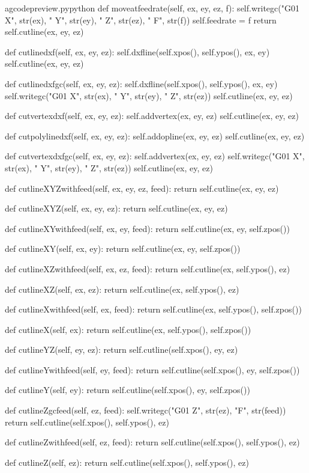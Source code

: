 \documentclass{ltxdoc}
\begin{document}
\lstset{firstnumber=\thegcpy}
\begin{writecode}{a}{gcodepreview.py}{python}
    def moveatfeedrate(self, ex, ey, ez, f):
        self.writegc("G01 X", str(ex), " Y", str(ey), " Z", str(ez), " F", str(f))
        self.feedrate = f
        return self.cutline(ex, ey, ez)

    def cutlinedxf(self, ex, ey, ez):
        self.dxfline(self.xpos(), self.ypos(), ex, ey)
        self.cutline(ex, ey, ez)

    def cutlinedxfgc(self, ex, ey, ez):
        self.dxfline(self.xpos(), self.ypos(), ex, ey)
        self.writegc("G01 X", str(ex), " Y", str(ey), " Z", str(ez))
        self.cutline(ex, ey, ez)

    def cutvertexdxf(self, ex, ey, ez):
        self.addvertex(ex, ey, ez)
        self.cutline(ex, ey, ez)

    def cutpolylinedxf(self, ex, ey, ez):
        self.addopline(ex, ey, ez)
        self.cutline(ex, ey, ez)

    def cutvertexdxfgc(self, ex, ey, ez):
        self.addvertex(ex, ey, ez)
        self.writegc("G01 X", str(ex), " Y", str(ey), " Z", str(ez))
        self.cutline(ex, ey, ez)

    def cutlineXYZwithfeed(self, ex, ey, ez, feed):
        return self.cutline(ex, ey, ez)

    def cutlineXYZ(self, ex, ey, ez):
        return self.cutline(ex, ey, ez)

    def cutlineXYwithfeed(self, ex, ey, feed):
        return self.cutline(ex, ey, self.zpos())

    def cutlineXY(self, ex, ey):
        return self.cutline(ex, ey, self.zpos())

    def cutlineXZwithfeed(self, ex, ez, feed):
        return self.cutline(ex, self.ypos(), ez)

    def cutlineXZ(self, ex, ez):
        return self.cutline(ex, self.ypos(), ez)

    def cutlineXwithfeed(self, ex, feed):
        return self.cutline(ex, self.ypos(), self.zpos())

    def cutlineX(self, ex):
        return self.cutline(ex, self.ypos(), self.zpos())

    def cutlineYZ(self, ey, ez):
        return self.cutline(self.xpos(), ey, ez)

    def cutlineYwithfeed(self, ey, feed):
        return self.cutline(self.xpos(), ey, self.zpos())

    def cutlineY(self, ey):
        return self.cutline(self.xpos(), ey, self.zpos())

    def cutlineZgcfeed(self, ez, feed):
        self.writegc("G01 Z", str(ez), "F", str(feed))
        return self.cutline(self.xpos(), self.ypos(), ez)

    def cutlineZwithfeed(self, ez, feed):
        return self.cutline(self.xpos(), self.ypos(), ez)

    def cutlineZ(self, ez):
        return self.cutline(self.xpos(), self.ypos(), ez)

\end{writecode}
\addtocounter{gcpy}{70}
\end{document}
